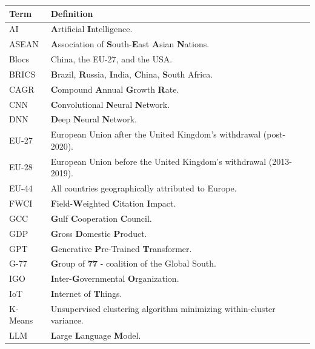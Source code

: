 \documentclass{article}
\begin{document}
	
	\begin{table}[htbp]
		\centering
		\begin{threeparttable}
			\vspace{2em}
			\label{tab:glossary}
			\small
			{\color{darkgray}
				\begin{tabular*}{\textwidth}{@{\extracolsep{\fill}}ll}
					\textbf{Term} & \textbf{Definition}\vspace{0.5em}\\
					\hline
					\noalign{\vskip 0.5em}
					AI & \textbf{A}rtificial \textbf{I}ntelligence. \\
					ASEAN & \textbf{A}ssociation of \textbf{S}outh-\textbf{E}ast \textbf{A}sian \textbf{N}ations. \\
					Blocs & China, the EU-27, and the USA. \\
					BRICS & \textbf{B}razil, \textbf{R}ussia, \textbf{I}ndia, \textbf{C}hina, \textbf{S}outh Africa. \\				
					CAGR & \textbf{C}ompound \textbf{A}nnual \textbf{G}rowth \textbf{R}ate. \\
					CNN & \textbf{C}onvolutional \textbf{N}eural \textbf{N}etwork. \\
					DNN & \textbf{D}eep \textbf{N}eural \textbf{N}etwork. \\
					EU-27 & European Union after the United Kingdom’s withdrawal (post-2020). \\
					EU-28 & European Union before the United Kingdom’s withdrawal (2013-2019). \\
					EU-44 & All countries geographically attributed to Europe. \\
					FWCI & \textbf{F}ield-\textbf{W}eighted \textbf{C}itation \textbf{I}mpact. \\
					GCC & \textbf{G}ulf \textbf{C}ooperation \textbf{C}ouncil. \\
					GDP & \textbf{G}ross \textbf{D}omestic \textbf{P}roduct. \\
					GPT & \textbf{G}enerative \textbf{P}re-Trained \textbf{T}ransformer. \\
					G-77 & \textbf{G}roup of \textbf{77} - coalition of the Global South. \\
					IGO & \textbf{I}nter-\textbf{G}overnmental \textbf{O}rganization. \\
					IoT & \textbf{I}nternet of \textbf{T}hings. \\
					K-Means & Unsupervised clustering algorithm minimizing within-cluster variance. \\
					LLM & \textbf{L}arge \textbf{L}anguage \textbf{M}odel. \\

\end{tabular*}}
\end{threeparttable}
\end{table}
\end{document}
